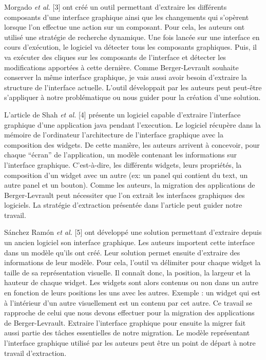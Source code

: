 \documentclass[11pt,]{article}
\begin{document}
Morgado \emph{et al.} {[}3{]} ont créé un outil permettant d'extraire
les différents composants d'une interface graphique ainsi que les
changements qui s'opèrent lorsque l'on effectue une action sur un
composant. Pour cela, les auteurs ont utilisé une stratégie de recherche
dynamique. Une fois lancée sur une interface en cours d'exécution, le
logiciel va détecter tous les composants graphiques. Puis, il va
exécuter des cliques sur les composants de l'interface et détecter les
modifications apportées à cette dernière. Comme Berger-Levrault souhaite
conserver la même interface graphique, je vais aussi avoir besoin
d'extraire la structure de l'interface actuelle. L'outil développait par
les auteurs peut peut-être s'appliquer à notre problématique ou nous
guider pour la création d'une solution.

L'article de Shah \emph{et al.} {[}4{]} présente un logiciel capable
d'extraire l'interface graphique d'une application java pendant
l'execution. Le logiciel récupère dans la mémoire de l'ordinateur
l'architecture de l'interface graphique avec la composition des widgets.
De cette manière, les auteurs arrivent à concevoir, pour chaque
``écran'' de l'application, un modèle contenant les informations sur
l'interface graphique. C'est-à-dire, les différents widgets, leurs
propriétés, la composition d'un widget avec un autre (ex: un panel qui
contient du text, un autre panel et un bouton). Comme les auteurs, la
migration des applications de Berger-Levrault peut nécessiter que l'on
extrait les interfaces graphiques des logiciels. La stratégie
d'extraction présentée dans l'article peut guider notre travail.

Sánchez Ramón \emph{et al.} {[}5{]} ont développé une solution
permettant d'extraire depuis un ancien logiciel son interface graphique.
Les auteurs importent cette interface dans un modèle qu'ils ont créé.
Leur solution permet ensuite d'extraire des informations de leur modèle.
Pour cela, l'outil va délimiter pour chaque widget la taille de sa
représentation visuelle. Il connaît donc, la position, la largeur et la
hauteur de chaque widget. Les widgets sont alors contenus ou non dans un
autre en fonction de leurs positions les uns avec les autres. Exemple :
un widget qui est à l'intérieur d'un autre visuellement est un contenu
par cet autre. Ce travail se rapproche de celui que nous devons
effectuer pour la migration des applications de Berger-Levrault.
Extraire l'interface graphique pour ensuite la migrer fait aussi partie
des tâches essentielles de notre migration. Le modèle représentant
l'interface graphique utilisé par les auteurs peut être un point de
départ à notre travail d'extraction.
\end{document}
